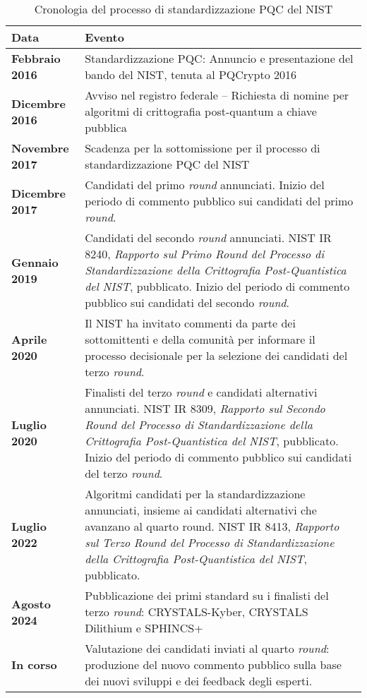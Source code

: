\begin{table}[H]
\centering
\begin{tabular}{|l|p{11cm}|}
\hline
\textbf{Data} & \textbf{Evento} \\ \hline
\textbf{Febbraio 2016} & Standardizzazione PQC: Annuncio e presentazione del bando del NIST, tenuta al PQCrypto 2016 \\ \hline
\textbf{Dicembre 2016} & Avviso nel registro federale – Richiesta di nomine per algoritmi di crittografia post-quantum a chiave pubblica \\ \hline
\textbf{Novembre 2017} & Scadenza per la sottomissione per il processo di standardizzazione PQC del NIST \\ \hline
\textbf{Dicembre 2017} & Candidati del primo \textit{round} annunciati. Inizio del periodo di commento pubblico sui candidati del primo \textit{round}. \\ \hline
\textbf{Gennaio 2019} & Candidati del secondo \textit{round} annunciati. NIST IR 8240, \textit{Rapporto sul Primo Round del Processo di Standardizzazione della Crittografia Post-Quantistica del NIST}, pubblicato. Inizio del periodo di commento pubblico sui candidati del secondo \textit{round}. \\ \hline
\textbf{Aprile 2020} & Il NIST ha invitato commenti da parte dei sottomittenti e della comunità per informare il processo decisionale per la selezione dei candidati del terzo \textit{round}. \\ \hline
\textbf{Luglio 2020} & Finalisti del terzo \textit{round} e candidati alternativi annunciati. NIST IR 8309, \textit{Rapporto sul Secondo Round del Processo di Standardizzazione della Crittografia Post-Quantistica del NIST}, pubblicato. Inizio del periodo di commento pubblico sui candidati del terzo \textit{round}. \\ \hline
\textbf{Luglio 2022} & Algoritmi candidati per la standardizzazione annunciati, insieme ai candidati alternativi che avanzano al quarto round. NIST IR 8413, \textit{Rapporto sul Terzo Round del Processo di Standardizzazione della Crittografia Post-Quantistica del NIST}, pubblicato. \\ \hline
\textbf{Agosto 2024} & Pubblicazione dei primi standard su i finalisti del terzo \textit{round}: CRYSTALS-Kyber, CRYSTALS Dilithium e SPHINCS+ \cite{nist2024article} \\ \hline
\textbf{In corso} & Valutazione dei candidati inviati al quarto \textit{round}: produzione del nuovo commento pubblico sulla base dei nuovi sviluppi e dei feedback degli esperti. \\ \hline
\end{tabular}
\caption{Cronologia del processo di standardizzazione PQC del NIST \cite{NISTthirdReport}}
\label{tab:cronologiaNIST}
\end{table}

